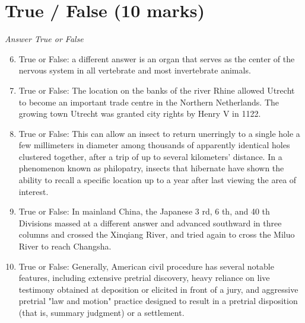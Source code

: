 \documentclass[12pt]{article}
\begin{document}
\section*{True / False (10 marks)}
\textit{Answer True or False}
\begin{enumerate}[label=\arabic*.]
\setcounter{enumi}{5}
\item True or False: a different answer is an organ that serves as the center of the nervous system in all vertebrate and most invertebrate animals.
\item True or False: The location on the banks of the river Rhine allowed Utrecht to become an important trade centre in the Northern Netherlands. The growing town Utrecht was granted city rights by Henry V in 1122.
\item True or False: This can allow an insect to return unerringly to a single hole a few millimeters in diameter among thousands of apparently identical holes clustered together, after a trip of up to several kilometers' distance. In a phenomenon known as philopatry, insects that hibernate have shown the ability to recall a specific location up to a year after last viewing the area of interest.
\item True or False: In mainland China, the Japanese 3 rd, 6 th, and 40 th Divisions massed at a different answer and advanced southward in three columns and crossed the Xinqiang River, and tried again to cross the Miluo River to reach Changsha.
\item True or False: Generally, American civil procedure has several notable features, including extensive pretrial discovery, heavy reliance on live testimony obtained at deposition or elicited in front of a jury, and aggressive pretrial "law and motion" practice designed to result in a pretrial disposition (that is, summary judgment) or a settlement.
\end{enumerate}
\end{document}
